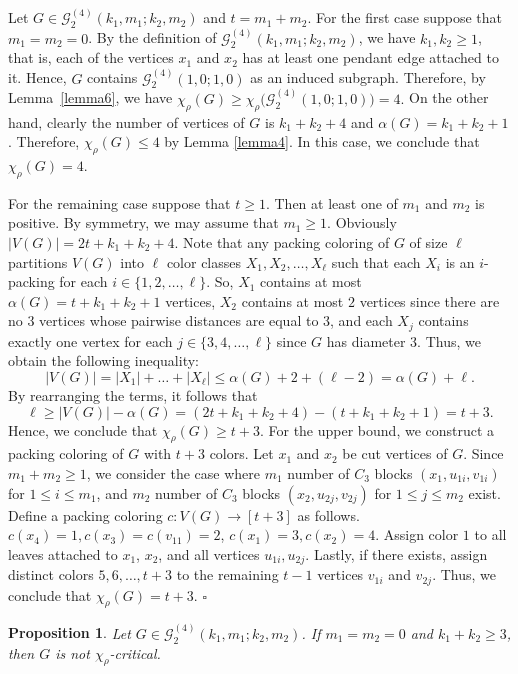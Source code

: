 \documentclass[12pt]{article}
\newtheorem{proposition}[theorem]{Proposition}
\newcommand{\proof}{\noindent{\bf Proof.\ }}
\newcommand{\qed}{\hfill $\square$ \bigskip}
\newcommand{\ie}{that is}
\begin{document}
\proof
Let $G \in \mathcal{G}_{2}^{(4)}(k_{1},m_{1};k_{2},m_{2})$ and $t = m_1+m_2$. For the first case suppose that $m_1= m_2=0$. 
By the definition of $\mathcal{G}_{2}^{(4)}(k_{1},m_{1};k_{2},m_{2})$, we have $k_1, k_2 \geq 1$, \ie, each of the vertices $x_1$ and $x_2$ has at least one pendant edge attached to it. 
Hence, $G$ contains $\mathcal{G}_{2}^{(4)}(1,0;1,0)$ as an induced subgraph. 
Therefore, by Lemma~\ref{lemma6}, we have $\chi_\rho(G) \geq \chi_\rho\big(\mathcal{G}_{2}^{(4)}(1,0;1,0)\big) = 4.$  On the other hand, clearly the number of vertices of \(G\) is \( k_1 + k_2 + 4  \) and $\alpha(G)=k_1+k_2+1$. Therefore, $\chi_\rho(G) \leq 4$ by Lemma \ref{lemma4}. In this case, we conclude that  $\chi_\rho(G) =  4$.
	
For the remaining case suppose that $t\geq 1$. Then at least one of $m_1$ and $m_2$ is positive. By symmetry, we may assume that $m_1\ge 1$. Obviously $|V(G)|=2t+k_1+k_2+4$.
Note that any packing coloring of $G$ of size $\ell$ partitions $V(G)$ into $\ell$ color classes $X_1, X_2, \dots, X_{\ell}$ such that each $X_i$ is an $i$-packing for each $i \in \{1, 2, \dots, \ell\}$. So, $X_1$ contains at most $\alpha(G)=t+k_1+k_2+1$ vertices, $X_2$ contains at most $2$ vertices since there are no $3$ vertices whose pairwise distances are equal to $3$, and each $X_j$ contains exactly one vertex for each $j \in \{3, 4, \dots, \ell\}$ since $G$ has diameter $3$. 
Thus, we obtain the following inequality:
$$|V(G)|=|X_1| + \dots + |X_{\ell}| \leq \alpha(G) + 2 + (\ell - 2) = \alpha(G) + \ell.$$
By rearranging the terms, it follows that
\[
\ell \geq |V(G)| - \alpha(G)
= (2t + k_1 + k_2 + 4) - (t + k_1 + k_2 + 1)
= t + 3.
\]
Hence, we conclude that $\chi_{\rho}(G) \geq t + 3.$
For the upper bound, we construct a packing coloring of $G$ with $t+3$ colors. Let $x_1$ and $x_2$ be cut vertices of $G$. Since $ m_1 + m_2 \geq 1$, we consider the case where $m_1$ number of $C_3$ blocks $(x_1,u_{1i},v_{1i})$ for $1 \leq i \leq m_1$, and $m_2$ number of $C_3$ blocks $(x_2,u_{2j},v_{2j})$ for $1 \leq j \leq m_2$ exist. Define a packing coloring $c:V(G)\to[t+3]$ as follows. 
$c(x_4)=1, c(x_3)=c(v_{11})=2$, $c(x_1)=3, c(x_2)=4.$ 
Assign color $1$ to all leaves attached to $x_1$, $x_2$, and all vertices $u_{1i}, u_{2j}$.
Lastly, if there exists, assign distinct colors $5,6,\dots,t+3$ to the remaining $t-1$ vertices $v_{1i}$ and $v_{2j}$. Thus, we conclude that  $\chi_\rho(G) =  t+3$. 
\qed


\begin{proposition}\label{pro15}
Let $G \in \mathcal{G}_{2}^{(4)}(k_{1},m_{1};k_{2},m_{2})$. If $m_1=m_2=0$ and $k_1+k_2 \geq 3$, then $G$ is not $\chi_{\rho}$-critical. 
\end{proposition}
\end{document}
